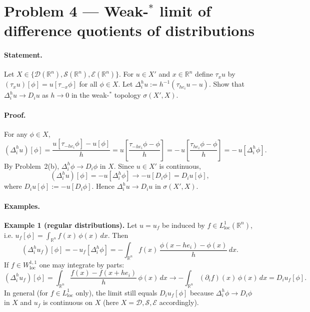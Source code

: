 \documentclass[12pt,a4paper]{article}
\theoremstyle{plain}
\theoremstyle{definition}
\theoremstyle{remark}
\theoremstyle{remark}
\begin{document}
\section*{Problem 4 — Weak-$^\ast$ limit of difference quotients of distributions}

\paragraph{Statement.}
Let $X\in\{\mathcal D(\mathbb R^n),\mathcal S(\mathbb R^n),\mathcal E(\mathbb R^n)\}$.
For $u\in X'$ and $x\in\mathbb R^n$ define $\tau_x u$ by $(\tau_x u)[\phi]=u[\tau_{-x}\phi]$ for all $\phi\in X$.
Let $\Delta_i^{h}u:=h^{-1}(\tau_{h e_i}u-u)$. Show that $\Delta_i^{h}u\to D_i u$ as $h\to0$ in the weak-$^\ast$ topology $\sigma(X',X)$.

\paragraph{Proof.}

For any $\phi\in X$,
\[
(\Delta_i^{h}u)[\phi]
=\frac{u[\tau_{-h e_i}\phi]-u[\phi]}{h}
=u\!\left[\frac{\tau_{-h e_i}\phi-\phi}{h}\right]
=-\,u\!\left[\frac{\tau_{h e_i}\phi-\phi}{h}\right]
=-\,u[\Delta_i^{h}\phi].
\]
By Problem~2(b), $\Delta_i^{h}\phi\to D_i\phi$ in $X$. Since $u\in X'$ is continuous,
\[
(\Delta_i^{h}u)[\phi]=-u[\Delta_i^{h}\phi]\longrightarrow -u[D_i\phi]
= D_i u[\phi],
\]
where $D_i u[\phi]:=-u[D_i\phi]$. Hence $\Delta_i^{h}u\to D_i u$ in $\sigma(X',X)$.


\paragraph{Examples.}

\bigskip

\textbf{Example 1 (regular distributions).}
Let $u=u_f$ be induced by $f\in L^1_{\mathrm{loc}}(\mathbb R^n)$, i.e.
$u_f[\phi]=\int_{\mathbb R^n} f(x)\,\phi(x)\,dx$.
Then
\[
(\Delta_i^{h}u_f)[\phi]
=-\,u_f[\Delta_i^{h}\phi]
=-\int_{\mathbb R^n} f(x)\,\frac{\phi(x-h e_i)-\phi(x)}{h}\,dx.
\]
If $f\in W^{1,1}_{\mathrm{loc}}$ one may integrate by parts:
\[
(\Delta_i^{h}u_f)[\phi]
=\int_{\mathbb R^n} \frac{f(x)-f(x+h e_i)}{h}\,\phi(x)\,dx
\longrightarrow -\int_{\mathbb R^n} (\partial_i f)(x)\,\phi(x)\,dx
= D_i u_f[\phi].
\]
In general (for $f\in L^1_{\mathrm{loc}}$ only), the limit still equals $D_i u_f[\phi]$ because
$\Delta_i^{h}\phi\to D_i\phi$ in $X$ and $u_f$ is continuous on $X$ (here $X=\mathcal D,\mathcal S,\mathcal E$ accordingly).
\end{document}
